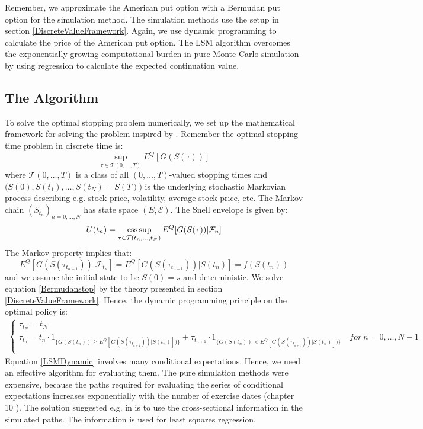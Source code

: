 Remember, we approximate the American put option with a Bermudan put option for the simulation method. The simulation methods use the setup in section \ref{DiscreteValueFramework}. Again, we use dynamic programming to calculate the price of the American put option. The LSM algorithm overcomes the exponentially growing computational burden in pure Monte Carlo simulation by using regression to calculate the expected continuation value.

\subsection{The Algorithm}
To solve the optimal stopping problem numerically, we set up the mathematical framework for solving the problem inspired by \parencite{analysisLSM}. Remember the optimal stopping time problem in discrete time is:
\begin{equation}\label{Bermudanstop}
\sup_{\tau \in \mathcal{T}(0,\ldots,T)} E^Q[G(S(\tau))]
\end{equation}
where $\mathcal{T}(0,\ldots,T)$ is a class of all $(0,\ldots,T)$-valued stopping times and $\bigg(S(0),S(t_1), \ldots, S(t_N)=S(T)\bigg)$ is the underlying stochastic Markovian process describing e.g. stock price, volatility, average stock price, etc. The Markov chain $(S_{t_n})_{n=0,\ldots,N}$ has state space $(E, \mathcal{E})$. The Snell envelope is given by:
$$U(t_n)=\operatorname*{ess\,sup}_{\tau \in \mathcal{T}(t_n,\ldots,t_N)} E^Q[G(S(\tau))|\mathcal{F}_n]$$
The Markov property implies that:
$$E^Q[G(S(\tau_{t_{n+1}}))|\mathcal{F}_{t_n}]=E^Q[G(S(\tau_{t_{n+1}}))|S(t_n)]=f(S(t_n))$$ 
and we assume the initial state to be $S(0)=s$ and deterministic. We solve equation \eqref{Bermudanstop} by the theory presented in section \ref{DiscreteValueFramework}. Hence, the dynamic programming principle on the optimal policy is:
\begin{equation}\label{LSMDynamic}
\begin{split}
\begin{cases}
          \tau_{t_N} = t_N\\
          \tau_{t_n} = t_n \cdot 1_{\{G(S(t_n)) \geq E^Q[G(S(\tau_{t_{n+1}}))|S(t_n)])\}} + \tau_{t_{n+1}} \cdot 1_{\{G(S(t_n)) < E^Q[G(S(\tau_{t_{n+1}}))|S(t_n)])\}} \quad for \ n={0,\ldots,N-1} \\ 
\end{cases}
\end{split}
\end{equation}
Equation \eqref{LSMDynamic} involves many conditional expectations. Hence, we need an effective algorithm for evaluating them. The pure simulation methods were expensive, because the paths required for evaluating the series of conditional expectations increases exponentially with the number of exercise dates (chapter 10 \parencite{OVERHAUSMARCUS2007EHD}). The solution suggested e.g. in \parencite{LSM,Tsitsiklis} is to use the cross-sectional information in the simulated paths. The information is used for least squares regression. \\

